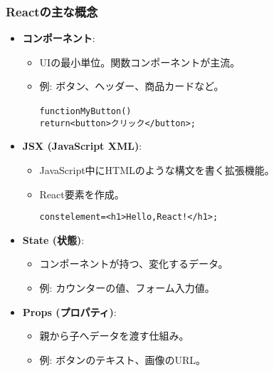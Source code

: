 \documentclass{beamer}
\begin{document}
\begin{frame}
    \frametitle{Reactの主な概念}
    \begin{itemize}
        \item \textbf{コンポーネント}:
            \begin{itemize}
                \item UIの最小単位。関数コンポーネントが主流。
                \item 例: ボタン、ヘッダー、商品カードなど。
                \begin{alltt}
function MyButton() {
  return <button>クリック</button>;
}
                \end{alltt}
            \end{itemize}
        \item \textbf{JSX (JavaScript XML)}:
            \begin{itemize}
                \item JavaScript中にHTMLのような構文を書く拡張機能。
                \item React要素を作成。
                \begin{alltt}
const element = <h1>Hello, React!</h1>;
                \end{alltt}
            \end{itemize}
        \item \textbf{State (状態)}:
            \begin{itemize}
                \item コンポーネントが持つ、変化するデータ。
                \item 例: カウンターの値、フォーム入力値。
            \end{itemize}
        \item \textbf{Props (プロパティ)}:
            \begin{itemize}
                \item 親から子へデータを渡す仕組み。
                \item 例: ボタンのテキスト、画像のURL。
            \end{itemize}
    \end{itemize}
\end{frame}
\end{document}
